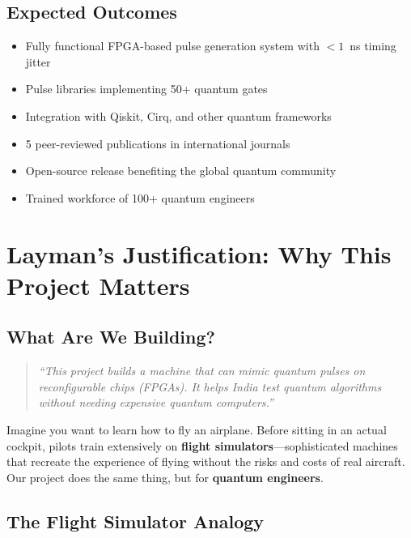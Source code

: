 \documentclass[12pt,a4paper]{article}
\theoremstyle{definition}
\begin{document}
\subsection{Expected Outcomes}

\begin{itemize}
    \item Fully functional FPGA-based pulse generation system with $<1$~ns timing jitter
    \item Pulse libraries implementing 50+ quantum gates
    \item Integration with Qiskit, Cirq, and other quantum frameworks
    \item 5 peer-reviewed publications in international journals
    \item Open-source release benefiting the global quantum community
    \item Trained workforce of 100+ quantum engineers
\end{itemize}

\section{Layman's Justification: Why This Project Matters}
\label{sec:layman}

\subsection{What Are We Building?}

\begin{quote}
\textit{``This project builds a machine that can mimic quantum pulses on reconfigurable chips (FPGAs). It helps India test quantum algorithms without needing expensive quantum computers.''}
\end{quote}

Imagine you want to learn how to fly an airplane. Before sitting in an actual cockpit, pilots train extensively on \textbf{flight simulators}---sophisticated machines that recreate the experience of flying without the risks and costs of real aircraft. Our project does the same thing, but for \textbf{quantum engineers}.

\subsection{The Flight Simulator Analogy}
\end{document}
